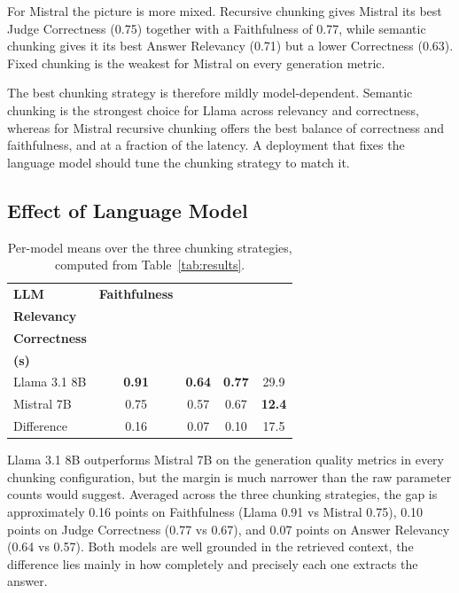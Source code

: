 For Mistral the picture is more mixed. Recursive chunking gives Mistral its best Judge Correctness (0.75) together with a Faithfulness of 0.77, while semantic chunking gives it its best Answer Relevancy (0.71) but a lower Correctness (0.63). Fixed chunking is the weakest for Mistral on every generation metric. 


The best chunking strategy is therefore mildly model-dependent. Semantic chunking is the strongest choice for Llama across relevancy and correctness, whereas for Mistral recursive chunking offers the best balance of correctness and faithfulness, and at a fraction of the latency. A deployment that fixes the language model should tune the chunking strategy to match it.

\subsection{Effect of Language Model}

\begin{table}[ht]
\centering
\begin{tabular}{lcccc}
\toprule
\textbf{LLM} & \textbf{Faithfulness}
  & \makecell{\textbf{Answer}\\\textbf{Relevancy}}
  & \makecell{\textbf{Judge}\\\textbf{Correctness}}
  & \makecell{\textbf{Latency}\\\textbf{(s)}} \\
\midrule
Llama 3.1 8B & \textbf{0.91} & \textbf{0.64} & \textbf{0.77} & 29.9 \\
Mistral 7B   & 0.75 & 0.57 & 0.67 & \textbf{12.4} \\
\midrule
Difference   & 0.16 & 0.07 & 0.10 & 17.5 \\
\bottomrule
\end{tabular}
\caption{Per-model means over the three chunking strategies, computed from Table~\ref{tab:results}.}
\label{tab:excerpt-model}
\end{table}

Llama 3.1 8B outperforms Mistral 7B on the generation quality metrics in every chunking configuration, but the margin is much narrower than the raw parameter counts would suggest. Averaged across the three chunking strategies, the gap is approximately 0.16 points on Faithfulness (Llama 0.91 vs Mistral 0.75), 0.10 points on Judge Correctness (0.77 vs 0.67), and 0.07 points on Answer Relevancy (0.64 vs 0.57). Both models are well grounded in the retrieved context, the difference lies mainly in how completely and precisely each one extracts the answer.

